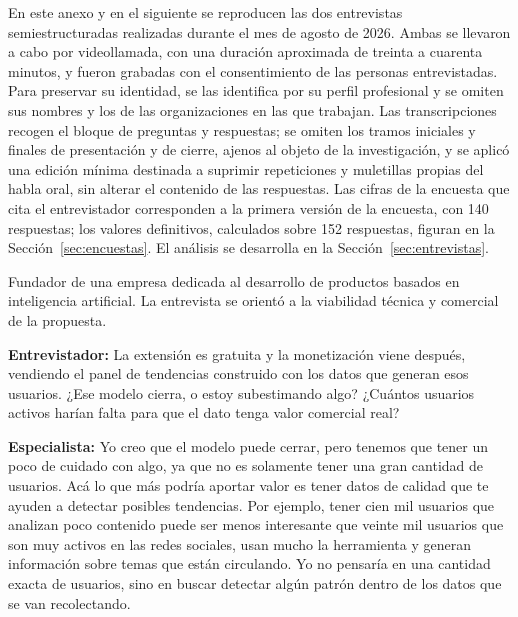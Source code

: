 \label{anexo:entrevista-especialista}

En este anexo y en el siguiente se reproducen las dos entrevistas semiestructuradas realizadas durante el mes de agosto de 2026. Ambas se llevaron a cabo por videollamada, con una duración aproximada de treinta a cuarenta minutos, y fueron grabadas con el consentimiento de las personas entrevistadas. Para preservar su identidad, se las identifica por su perfil profesional y se omiten sus nombres y los de las organizaciones en las que trabajan. Las transcripciones recogen el bloque de preguntas y respuestas; se omiten los tramos iniciales y finales de presentación y de cierre, ajenos al objeto de la investigación, y se aplicó una edición mínima destinada a suprimir repeticiones y muletillas propias del habla oral, sin alterar el contenido de las respuestas. Las cifras de la encuesta que cita el entrevistador corresponden a la primera versión de la encuesta, con 140 respuestas; los valores definitivos, calculados sobre 152 respuestas, figuran en la Sección~\ref{sec:encuestas}. El análisis se desarrolla en la Sección~\ref{sec:entrevistas}.

Fundador de una empresa dedicada al desarrollo de productos basados en inteligencia artificial. La entrevista se orientó a la viabilidad técnica y comercial de la propuesta.

\bigskip

\noindent\textbf{Entrevistador:} La extensión es gratuita y la monetización viene después, vendiendo el panel de tendencias construido con los datos que generan esos usuarios. ¿Ese modelo cierra, o estoy subestimando algo? ¿Cuántos usuarios activos harían falta para que el dato tenga valor comercial real?

\noindent\textbf{Especialista:} Yo creo que el modelo puede cerrar, pero tenemos que tener un poco de cuidado con algo, ya que no es solamente tener una gran cantidad de usuarios. Acá lo que más podría aportar valor es tener datos de calidad que te ayuden a detectar posibles tendencias. Por ejemplo, tener cien mil usuarios que analizan poco contenido puede ser menos interesante que veinte mil usuarios que son muy activos en las redes sociales, usan mucho la herramienta y generan información sobre temas que están circulando. Yo no pensaría en una cantidad exacta de usuarios, sino en buscar detectar algún patrón dentro de los datos que se van recolectando.

\medskip


